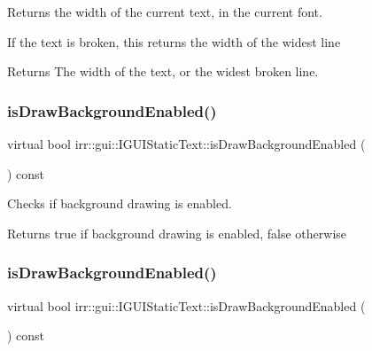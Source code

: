Returns the width of the current text, in the current font. 

If the text is broken, this returns the width of the widest line \begin{DoxyReturn}{Returns}
The width of the text, or the widest broken line. 
\end{DoxyReturn}
\mbox{\label{classirr_1_1gui_1_1IGUIStaticText_ab6da7f10a72d023729d12c85e2926aec}} 
\subsubsection{\texorpdfstring{is\+Draw\+Background\+Enabled()}{isDrawBackgroundEnabled()}\hspace{0.1cm}{\footnotesize\ttfamily [1/2]}}
{\footnotesize\ttfamily virtual bool irr\+::gui\+::\+I\+G\+U\+I\+Static\+Text\+::is\+Draw\+Background\+Enabled (\begin{DoxyParamCaption}{ }\end{DoxyParamCaption}) const\hspace{0.3cm}{\ttfamily [pure virtual]}}



Checks if background drawing is enabled. 

\begin{DoxyReturn}{Returns}
true if background drawing is enabled, false otherwise 
\end{DoxyReturn}
\mbox{\label{classirr_1_1gui_1_1IGUIStaticText_ab6da7f10a72d023729d12c85e2926aec}} 
\subsubsection{\texorpdfstring{is\+Draw\+Background\+Enabled()}{isDrawBackgroundEnabled()}\hspace{0.1cm}{\footnotesize\ttfamily [2/2]}}
{\footnotesize\ttfamily virtual bool irr\+::gui\+::\+I\+G\+U\+I\+Static\+Text\+::is\+Draw\+Background\+Enabled (\begin{DoxyParamCaption}{ }\end{DoxyParamCaption}) const\hspace{0.3cm}{\ttfamily [pure virtual]}}



